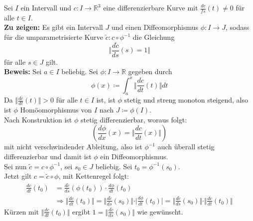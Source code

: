 \begin{problem*}[3]
  Sei \( I \) ein Intervall und \( c: I \to \mathbb{R}^3 \) eine differenzierbare Kurve mit \( \frac{dc}{fs}(t) \neq 0 \) für alle \( t \in I \). \\
  \textbf{Zu zeigen:} Es gibt ein Intervall \( J \) und einen Diffeomorphismus \( \phi : I \to J \), sodass für die umparametrisierte Kurve \( \tilde{c}: c \circ \phi^{-1} \) die Gleichung 
  \begin{equation*}
    \Vert \frac{d\tilde{c}}{ds}(s) = 1 \Vert
  \end{equation*}
  für alle \( s \in J \) gilt. \\
  \textbf{Beweis:} Sei \( a \in I \) beliebig. Sei \( \phi: I \to \mathbb{R} \) gegeben durch 
  \begin{equation*}
    \phi(x) \coloneqq \int_a^x { \Vert \frac{dc}{dt}(t) \Vert}dt
  \end{equation*}
  Da \( \Vert \frac{dc}{dt}(t) \Vert > 0 \) für alle \( t \in I \) ist, ist \( \phi \) stetig und streng monoton steigend, also ist \( \phi \) Homöomorphismus von \( I \) nach \( J \coloneqq \phi (I) \). \\
  Nach Konstruktion ist \( \phi \) stetig differenzierbar, woraus folgt:
  \begin{equation*}
    \left(\frac{d \phi}{dx}(x) = \Vert \frac{dc}{dt}(x) \Vert\right)
  \end{equation*}
  mit nicht verschwindender Ableitung, also ist \( \phi^{-1} \) auch überall stetig differenzierbar und damit ist \( \phi \) ein Diffeomorphismus. \\
  Sei nun \( \tilde{c} = c \circ \phi^{-1} \), sei \( s_0 \in J \) beliebig. Sei \( t_0 = \phi^{-1}(s_0) \). \\
  Jetzt gilt \( c = \tilde{c} \circ \phi \), mit Kettenregel folgt:
  \begin{align*}
    \frac{dc}{dt}(t_0) &= \frac{d \tilde{c}}{ds}(\phi(t_0))\cdot \frac{d \phi}{dt}(t_0) \\
    &\Rightarrow \Vert \frac{dc}{dt}(t_0)\Vert = \Vert \frac{d \tilde{c}}{ds}(s_0) \Vert \cdot \vert \frac{d \phi}{dt}(t_0) \vert = \Vert \frac{d \tilde{c}}{ds}(s_0) \Vert \cdot \Vert \frac{dc}{dt}(t_0) \Vert
  \end{align*}
  Kürzen mit \( \Vert \frac{dc}{dt} (t_0) \Vert \) ergibt \( 1 = \Vert \frac{d \tilde{c}}{ds}(s_0) \Vert \) wie gewünscht. \\
\end{problem*}



